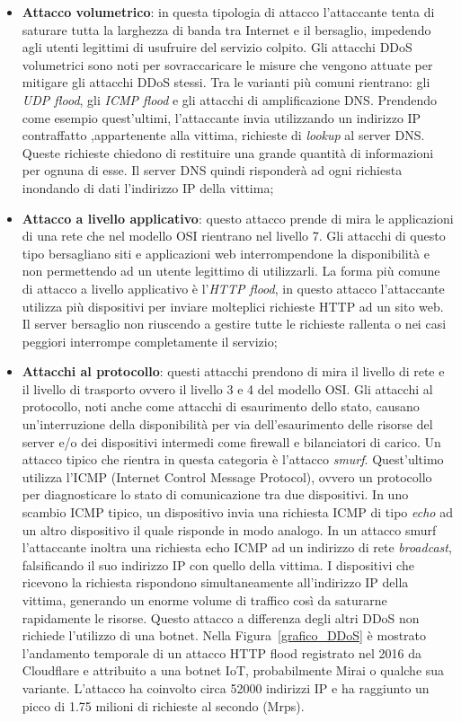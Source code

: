 \begin{itemize}
    \item \textbf{Attacco volumetrico}: in questa tipologia di attacco l'attaccante tenta di saturare tutta la larghezza di banda tra Internet e il bersaglio, impedendo agli utenti legittimi di usufruire del servizio colpito. Gli attacchi DDoS volumetrici sono noti per sovraccaricare le misure che vengono attuate per mitigare gli attacchi DDoS stessi. Tra le varianti più comuni rientrano: gli \emph{UDP flood}, gli \emph{ICMP flood} e gli attacchi di amplificazione DNS. Prendendo come esempio quest'ultimi, l'attaccante invia utilizzando un indirizzo IP contraffatto ,appartenente alla vittima,  richieste di \emph{lookup} al server DNS. Queste richieste chiedono di restituire una grande quantità di informazioni per ognuna di esse. Il server DNS quindi risponderà ad ogni richiesta inondando di dati l'indirizzo IP della vittima; 
    \item \textbf{Attacco a livello applicativo}: questo attacco prende di mira le applicazioni di una rete che nel modello OSI rientrano nel livello 7. Gli attacchi di questo tipo bersagliano siti e applicazioni web interrompendone la disponibilità e non permettendo ad un utente legittimo di utilizzarli. La forma più comune di attacco a livello applicativo è l'\emph{HTTP flood}, in questo attacco l'attaccante utilizza più dispositivi per inviare molteplici richieste HTTP ad un sito web. Il server bersaglio non riuscendo a gestire tutte le richieste rallenta o nei casi peggiori interrompe completamente il servizio;
    \item \textbf{Attacchi al protocollo}: questi attacchi prendono di mira il livello di rete e il livello di trasporto ovvero il livello 3 e 4 del modello OSI. Gli attacchi al protocollo, noti anche come attacchi di esaurimento dello stato, causano un'interruzione della disponibilità per via dell'esaurimento delle risorse del server e/o dei dispositivi intermedi come firewall e bilanciatori di carico. Un attacco tipico che rientra in questa categoria è l'attacco \emph{smurf}. Quest'ultimo utilizza l'ICMP (Internet Control Message Protocol), ovvero un protocollo per diagnosticare lo stato di comunicazione tra due dispositivi. In uno scambio ICMP tipico, un dispositivo invia una richiesta ICMP di tipo \emph{echo} ad un altro dispositivo il quale risponde in modo analogo. In un attacco smurf l'attaccante inoltra una richiesta echo ICMP  ad un indirizzo di rete \emph{broadcast}, falsificando il suo indirizzo IP con quello della vittima. I dispositivi che ricevono la richiesta rispondono simultaneamente all'indirizzo IP della vittima, generando un enorme volume di traffico così da saturarne rapidamente le risorse. Questo attacco a differenza degli altri DDoS non richiede l'utilizzo di una botnet. Nella Figura~\ref{grafico_DDoS} è mostrato l'andamento temporale di un attacco HTTP flood registrato nel 2016 da Cloudflare e attribuito a una botnet IoT, probabilmente Mirai o qualche sua variante. L'attacco ha coinvolto circa 52000 indirizzi IP e ha raggiunto un picco di 1.75 milioni di richieste al secondo (Mrps).
    
\end{itemize}
